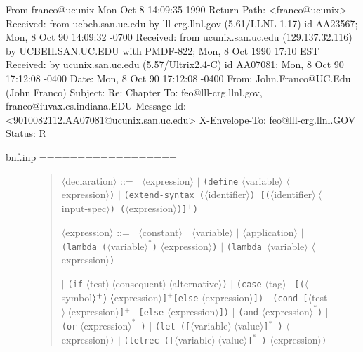 From franco@ucunix Mon Oct  8 14:09:35 1990
Return-Path: <franco@ucunix>
Received: from ucbeh.san.uc.edu by lll-crg.llnl.gov (5.61/LLNL-1.17)
	id AA23567; Mon, 8 Oct 90 14:09:32 -0700
Received: from ucunix.san.uc.edu (129.137.32.116) by UCBEH.SAN.UC.EDU with
 PMDF-822; Mon, 8 Oct 1990 17:10 EST
Received: by ucunix.san.uc.edu (5.57/Ultrix2.4-C) id AA07081; Mon, 8 Oct 90
 17:12:08 -0400
Date: Mon, 8 Oct 90 17:12:08 -0400
From: John.Franco@UC.Edu (John Franco)
Subject: Re:  Chapter
To: feo@lll-crg.llnl.gov, franco@iuvax.cs.indiana.EDU
Message-Id: <9010082112.AA07081@ucunix.san.uc.edu>
X-Envelope-To: feo@lll-crg.llnl.GOV
Status: R

bnf.inp
==================


\begin{figure}%
\begin{frameit}
\begin{quote}
\indent $\langle$declaration$\rangle$ ::= \hfil\break
\indent\indent $~$ $\langle$expression$\rangle$\hfil\break
\indent\indent $\vert$ {\small\tt (define} $\langle$variable$\rangle$
$\langle$expression$\rangle${\small\tt )}\hfil\break
\indent\indent $\vert$ {\small\tt (extend-syntax 
 (}$\langle$identifier$\rangle${\small\tt )
 [(}$\langle$identifier$\rangle~\langle$input-spec$\rangle${\small\tt )
 (}$\langle$expression$\rangle${\small\tt )]$^+$)}\hfil\break

\indent $\langle$expression$\rangle$ ::= \hfil\break
\indent\indent $~$ $\langle$constant$\rangle$\hfil\break
\indent\indent $\vert$ $\langle$variable$\rangle$\hfil\break
\indent\indent $\vert$ $\langle$application$\rangle$\hfil\break
\indent\indent $\vert$ {\small\tt (lambda (}$\langle$variable$\rangle
 ^*${\small\tt )} $\langle$expression$\rangle${\small\tt )}
 $\vert$ {\small\tt (lambda }$\langle$variable$\rangle
 $ $\langle$expression$\rangle${\small\tt )}\hfil\break

\indent\indent $\vert$ {\small\tt (if}
 $\langle$test$\rangle~\langle$consequent$\rangle~\langle$alternative$\rangle${\small\tt )}\hfil\break
\indent\indent $\vert$ {\small\tt (case} $\langle$tag$\rangle$ {\small\tt
 [(}$\langle$symbol$\rangle ^+{\small\tt
 )}~\langle$expression$\rangle${\small\tt ]}$^+${\small\tt [else}
 $\langle$expression$\rangle${\small\tt ])}\hfil\break
\indent\indent $\vert$ {\small\tt (cond
 [}$\langle$test$\rangle~\langle$expression$\rangle${\small\tt ]}$^+$ {\small\tt
 [else} $\langle$expression$\rangle${\small\tt ])}\hfil\break
\indent\indent $\vert$ {\small\tt (and} $\langle$expression$\rangle
 ^*${\small\tt )}\hfil\break
\indent\indent $\vert$ {\small\tt (or} $\langle$expression$\rangle ^*${\small\tt
 )}\hfil\break
\indent\indent $\vert$ {\small\tt (let
 ([}$\langle$variable$\rangle~\langle$value$\rangle${\small\tt ]}$^*${\small\tt
 )} $\langle$expression$\rangle${\small\tt )}\hfil\break
\indent\indent $\vert$ {\small\tt (letrec
 ([}$\langle$variable$\rangle~\langle$value$\rangle${\small\tt ]}$^*${\small\tt
 )} $\langle$expression$\rangle${\small\tt )}\hfil\break


\end{quote}
\end{frameit}
\end{figure}

